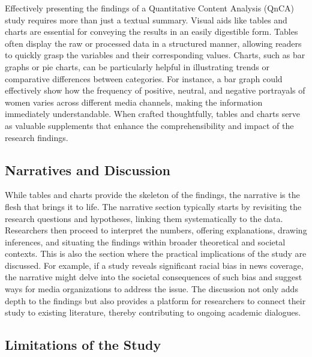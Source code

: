 \documentclass[
  b5paper]{book}
\begin{document}
Effectively presenting the findings of a Quantitative Content Analysis (QnCA) study requires more than just a textual summary. Visual aids like tables and charts are essential for conveying the results in an easily digestible form. Tables often display the raw or processed data in a structured manner, allowing readers to quickly grasp the variables and their corresponding values. Charts, such as bar graphs or pie charts, can be particularly helpful in illustrating trends or comparative differences between categories. For instance, a bar graph could effectively show how the frequency of positive, neutral, and negative portrayals of women varies across different media channels, making the information immediately understandable. When crafted thoughtfully, tables and charts serve as valuable supplements that enhance the comprehensibility and impact of the research findings.

\hypertarget{narratives-and-discussion}{%
\subsection*{Narratives and Discussion}\label{narratives-and-discussion}}

While tables and charts provide the skeleton of the findings, the narrative is the flesh that brings it to life. The narrative section typically starts by revisiting the research questions and hypotheses, linking them systematically to the data. Researchers then proceed to interpret the numbers, offering explanations, drawing inferences, and situating the findings within broader theoretical and societal contexts. This is also the section where the practical implications of the study are discussed. For example, if a study reveals significant racial bias in news coverage, the narrative might delve into the societal consequences of such bias and suggest ways for media organizations to address the issue. The discussion not only adds depth to the findings but also provides a platform for researchers to connect their study to existing literature, thereby contributing to ongoing academic dialogues.

\hypertarget{limitations-of-the-study}{%
\subsection*{Limitations of the Study}\label{limitations-of-the-study}}
\end{document}
